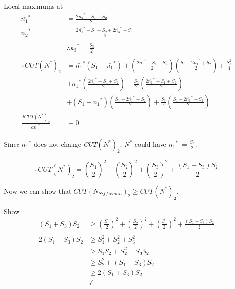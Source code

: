 \documentclass[12pt]{article}
\begin{document}
Local maximums at
\begin{align}
    \bar{n_1}^* &= \frac{2\bar{n_2}^* - S_1 + S_2}{2}                           \nonumber \\
    \bar{n_2}^* &= \frac{ 2\bar{n_{1}}^* - S_{1} + S_2 + 2\bar{n_{3}}^* - S_{3} }{2}
                                                                            \nonumber \\
                                                                            \nonumber \\
        &\therefore \bar{n_3}^* = \frac{S_3}{2}                               \nonumber \\
                                                                            \nonumber \\
    \therefore CUT(N^*)_2 &= \bar{n_1}^*(S_1-\bar{n_1}^*)
        + \left(\frac{2\bar{n_1}^* - S_1 + S_2}{2}\right)\left(\frac{S_1 - 2\bar{n_1}^* + S_2}{2}\right)
        + \frac{S_3^2}{4}                                                   \nonumber \\
        &+ \bar{n_1}^*\left(\frac{2\bar{n_1}^* - S_1 + S_2}{2}\right)
        + \frac{S_3}{2}\left(\frac{2\bar{n_1}^* - S_1 + S_2}{2}\right)        \nonumber \\
        &+ (S_1 - \bar{n_1}^*)\left(\frac{S_1 - 2\bar{n_1}^* + S_2}{2}\right)
        + \frac{S_3}{2}\left(\frac{S_1 - 2\bar{n_1}^* + S_2}{2}\right)        \nonumber \\
    \frac{dCUT(N^*)_2}{d\bar{n_1}^*} &\equiv 0                                        \nonumber
\end{align}

Since $\bar{n_1}^*$ does not change $CUT(N^*)_2$, $N^*$ could have $\bar{n_1}^* := \frac{S_2}{2}$.

$$\therefore CUT(N^*)_2 = \left(\frac{S_1}{2}\right)^2 + \left(\frac{S_2}{2}\right)^2 + \left(\frac{S_3}{2}\right)^2 + \frac{(S_1 + S_3)S_2}{2}$$



Now we can show that $CUT(N_{Sifferman})_2 \geq CUT(N^*)_2$.

Show
\begin{align}
    (S_1 + S_3)S_2  &\geq \left(\frac{S_1}{2}\right)^2 + \left(\frac{S_2}{2}\right)^2 + \left(\frac{S_3}{2}\right)^2 + \frac{(S_1 + S_3)S_2}{2} \nonumber \\
\nonumber \\
    2(S_1 + S_3)S_2 &\geq S_1^2 + S_2^2 + S_3^2     \nonumber \\
                    &\geq S_1S_2 + S_2^2 + S_3S_2   \nonumber \\
                    &\geq S_2^2 + (S_1 + S_3)S_2    \nonumber \\
                    &\geq 2(S_1 + S_3)S_2           \nonumber \\
                    &\checkmark                     \nonumber
\end{align}
\end{document}
